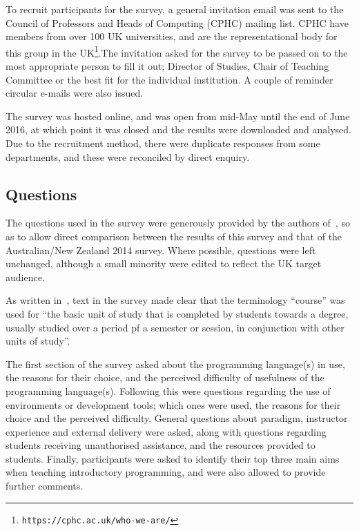 \documentclass{sig-alternate}
\begin{document}
To recruit participants for the survey, a general invitation email was sent to the Council of Professors and Heads of Computing (CPHC) mailing list. CPHC have members from over 100 UK universities, and are the representational body for this group in the UK\footnote{\texttt{https://cphc.ac.uk/who-we-are/}}.The invitation asked for the survey to be passed on to the most appropriate person to fill it out; Director of Studies, Chair of Teaching Committee or the best fit for the individual institution. A couple of reminder circular e-mails were also issued.

The survey was hosted online, and was open from mid-May until the end of June 2016, at which point it was closed and the results were downloaded and analysed. Due to the recruitment method, there were duplicate responses from some departments, and these were reconciled by direct enquiry.
\subsection{Questions}

The questions used in the survey were generously provided by the authors of~\cite{mason+cooper:2014}, so as to allow direct comparison between the results of this survey and that of the Australian/New Zealand 2014 survey. Where possible, questions were left unchanged, although a small minority were edited to reflect the UK target audience. 

As written in~\cite{mason+cooper:2014}, text in the survey made clear that the terminology ``course'' was used for ``the basic unit of study that is completed by students towards a degree, usually studied over a period pf a semester or session, in conjunction with other units of study''. 

The first section of the survey asked about the programming language(s) in use, the reasons for their choice, and the perceived difficulty of usefulness of the programming language(s). Following this were questions regarding the use of environments or development tools; which ones were used, the reasons for their choice and the perceived difficulty. General questions about paradigm, instructor experience and external delivery were asked, along with questions regarding students receiving unauthorised assistance, and the resources provided to students. Finally, participants were asked to identify their top three main aims when teaching introductory programming, and were also allowed to provide further comments. 
\end{document}
